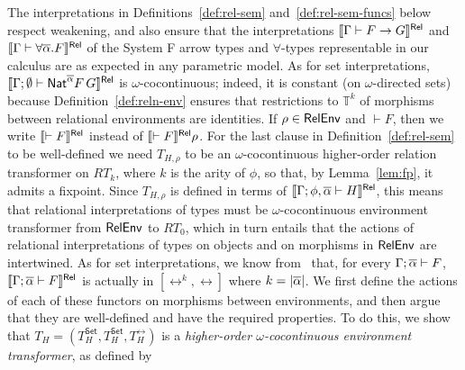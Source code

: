 \documentclass{lmcs}
\theoremstyle{plain}\newtheorem{satz}[thm]{Satz}
\newcommand{\set}{\mathsf{Set}}
\begin{document}
{The interpretations in Definitions~\ref{def:rel-sem}
and~\ref{def:rel-sem-funcs} below respect weakening, and also ensure
that the interpretations $\llbracket{\Gamma \vdash F \to G}\rrbracket^{\mathsf{Rel}}$ and
$\llbracket{\Gamma \vdash \forall \overline{\alpha}. F}\rrbracket^{\mathsf{Rel}}$ of the System F arrow
types and $\forall$-types representable in our calculus are as
expected in any parametric model.  As for set interpretations,
$\llbracket{\Gamma; \emptyset \vdash \mathsf{Nat}^{\overline{\alpha}} F\,G}\rrbracket^{\mathsf{Rel}}$ is
$\omega$-cocontinuous; indeed, it is constant (on $\omega$-directed
sets) because Definition~\ref{def:reln-env} ensures that restrictions
to $\mathbb{T}^k$ of morphisms between relational environments are
identities. If $\rho \in \mathsf{RelEnv}$ and $\vdash F$, then we write
$\llbracket{\vdash F}\rrbracket^{\mathsf{Rel}}$ instead of $\llbracket{\vdash F}\rrbracket^{\mathsf{Rel}}\rho$.  For the last
clause in Definition~\ref{def:rel-sem} to be well-defined we need
$T_{H,\rho}$ to be an $\omega$-cocontinuous higher-order relation
transformer on $RT_k$, where $k$ is the arity of $\phi$, so that, by
Lemma~\ref{lem:fp}, it admits a fixpoint. Since $T_{H,\rho}$ is
defined in terms of $\llbracket{\Gamma;\phi, \overline{\alpha} \vdash H}\rrbracket^{\mathsf{Rel}}$, this
means that relational interpretations of types must be
$\omega$-cocontinuous environment transformer from $\mathsf{RelEnv}$ to
$RT_0$, which in turn entails that the actions of relational
interpretations of types on objects and on morphisms in $\mathsf{RelEnv}$ are
intertwined. As for set interpretations, we know from~\cite{jp19}
that, for every $\Gamma; \overline{\alpha} \vdash F$, $\llbracket{\Gamma;
  \overline{\alpha} \vdash F}\rrbracket^{\mathsf{Rel}}$ is actually in $[\rel^k,\rel]$ where $k =
|\overline{\alpha}|$. We first define the actions of each of these functors
on morphisms between environments, and then argue that they are
well-defined and have the required properties. To do this, we show
that $T_H = (T^\set_H, T^\set_H, T^\rel_H) $ is a {\em higher-order
  $\omega$-cocontinuous environment transformer}, as defined by

}
\end{document}

